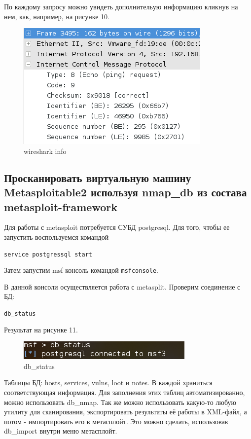 \documentclass[11pt, a4paper]{article}		%
\begin{document}
По каждому запросу можно увидеть дополнительую информацию кликнув на нем, как, например, на рисунке 10.

\begin{figure}[h!]
\centering
\includegraphics[scale=0.8]{res/wireshark_info}
\caption{wireshark info}
\end{figure}


\subsection{Просканировать виртуальную машину Metasploitable2 используя nmap\_db из состава metasploit-framework}

Для работы с metasploit потребуется СУБД postgresql. Для того, чтобы ее запустить воспользуемся командой 

\verb'service postgressql start'

Затем запустим msf консоль командой \verb'msfconsole'.

В данной консоли осуществляется работа с metasplit. Проверим соединение с БД:

\verb'db_status'

Результат на рисунке 11.

\begin{figure}[h!]
\centering
\includegraphics[scale=0.8]{res/db_status}
\caption{db\_status}
\end{figure}

Таблицы БД: hosts, services, vulns, loot и notes. В каждой храниться соответствующая информация.
Для заполнения этих таблиц автоматизированно, можно использовать db\_nmap. Так же можно использовать какую-то любую утилиту для сканирования, экспортировать результаты её работы в XML-файл, а потом - импортировать его в метасплойт. Это можно сделать, использовав db\_import внутри меню метасплойт.
\end{document}
